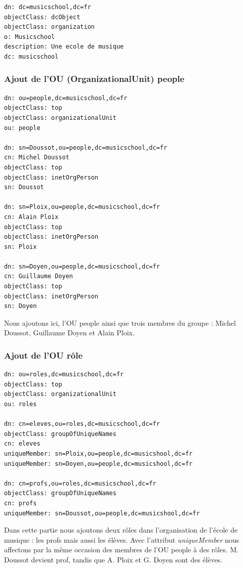 \documentclass[12pt,a4paper,notitlepage]{article}
\begin{document}
\begin{lstlisting}[title=racine.ldif]
dn: dc=musicschool,dc=fr
objectClass: dcObject
objectClass: organization
o: Musicschool
description: Une ecole de musique 
dc: musicschool 
\end{lstlisting}


\subsubsection{Ajout de l'OU (OrganizationalUnit) people}

\begin{lstlisting}[title=people.ldif]
dn: ou=people,dc=musicschool,dc=fr
objectClass: top
objectClass: organizationalUnit
ou: people

dn: sn=Doussot,ou=people,dc=musicschool,dc=fr
cn: Michel Doussot
objectClass: top
objectClass: inetOrgPerson
sn: Doussot

dn: sn=Ploix,ou=people,dc=musicschool,dc=fr
cn: Alain Ploix
objectClass: top
objectClass: inetOrgPerson
sn: Ploix

dn: sn=Doyen,ou=people,dc=musicschool,dc=fr
cn: Guillaume Doyen
objectClass: top
objectClass: inetOrgPerson
sn: Doyen

\end{lstlisting}
Nous ajoutons ici, l'OU people ainsi que trois membres du groupe : Michel Doussot, Guillaume Doyen et Alain Ploix.

\subsubsection{Ajout de l'OU rôle}

\begin{lstlisting}[title=role.ldif]
dn: ou=roles,dc=musicschool,dc=fr
objectClass: top
objectClass: organizationalUnit
ou: roles

dn: cn=eleves,ou=roles,dc=musicschool,dc=fr
objectClass: groupOfUniqueNames
cn: eleves
uniqueMember: sn=Ploix,ou=people,dc=musicshool,dc=fr
uniqueMember: sn=Doyen,ou=people,dc=musicshool,dc=fr

dn: cn=profs,ou=roles,dc=musicschool,dc=fr
objectClass: groupOfUniqueNames
cn: profs
uniqueMember: sn=Doussot,ou=people,dc=musicshool,dc=fr
\end{lstlisting}
Dans cette partie nous ajoutons deux rôles dans l'organisation de l'école de musique : les profs mais aussi les élèves. Avec l'attribut \textit{uniqueMember} nous affectons par la même occasion des membres de l'OU people à des rôles. M. Doussot devient prof, tandis que A. Ploix et G. Doyen sont des élèves.
\end{document}

